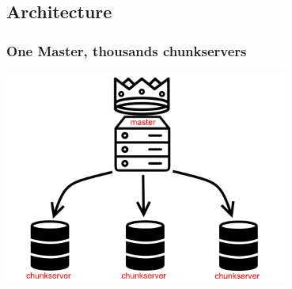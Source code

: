 \documentclass{beamer}
\newcommand{\slideheight}{7cm}
\begin{document}
\subsection{Architecture}
%
\begin{frame}
 \frametitle{One Master, thousands chunkservers}
 \centering
 \includegraphics[height=\slideheight]{figures/masterschema.png}
\end{frame}
\end{document}
